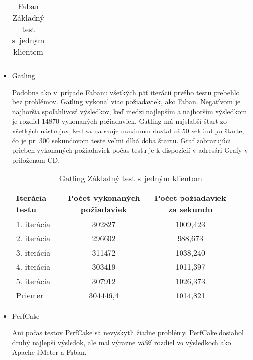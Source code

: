 \documentclass[12pt,oneside,final]{fithesis-utf8}
\begin{document}
\begin{itemize}
\begin{table}[H]
\begin{center}
\begin{tabular}{ | l | c | c | c | c |}
\end{tabular}
\end{center}
\caption{Faban Základný test s~jedným klientom}
\end{table}


\item Gatling

Podobne ako v~prípade Fabanu všetkých päť iterácií prvého testu prebehlo bez problémov. Gatling vykonal viac požiadaviek, ako Faban. Negatívom je najhoršia spoľahlivosť výsledkov, keď medzi najlepším a najhorším výsledkom je rozdiel 14870 vykonaných požiadaviek. Gatling má najslabší štart zo všetkých nástrojov, keď sa na svoje maximum dostal až 50 sekúnd po štarte, čo je pri 300 sekundovom teste veľmi dlhá doba štartu. Graf zobrazujúci priebeh vykonaných požiadaviek počas testu je k dispozícií v adresári Grafy v priloženom CD.

\begin{table}[H]
\begin{center}
\begin{tabular}{ | l | c | c | c | c |}
		\hline
		 \textbf{Iterácia testu} & \textbf{Počet vykonaných požiadaviek} & \textbf{Počet požiadaviek za sekundu} \\ \hline
		 1. iterácia & 302827 & 1009,423 \\ \hline
		 2. iterácia & 296602 & 988,673 \\ \hline
		 3. iterácia & 311472 & 1038,240 \\ \hline
		 4. iterácia & 303419 & 1011,397 \\ \hline
		 5. iterácia & 307912 & 1026,373 \\ \hline
		 Priemer & 304446,4 & 1014,821 \\ \hline
		 
\end{tabular}
\end{center}
\caption{Gatling Základný test s~jedným klientom}
\end{table}


\item PerfCake

Ani počas testov PerfCake sa nevyskytli žiadne problémy. PerfCake dosiahol druhý najlepší výsledok, ale mal výrazne väčší rozdiel vo výsledkoch ako Apache JMeter a Faban.


\end{itemize}
\end{document}
